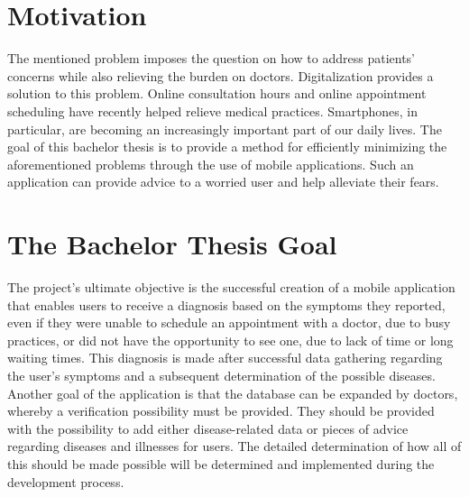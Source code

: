 \section{Motivation}
The mentioned problem imposes the question on how to address patients’ concerns while also relieving the burden on doctors. Digitalization provides a solution to this problem. Online consultation hours and online appointment scheduling have recently helped relieve medical practices. Smartphones, in particular, are becoming an increasingly important part of our daily lives. The goal of this bachelor thesis is to provide a method for efficiently minimizing the aforementioned problems through the use of mobile applications. Such an application can provide advice to a worried user and help alleviate their fears.

\section{The Bachelor Thesis Goal}
The project's ultimate objective is the successful creation of a mobile application that enables users to receive a diagnosis based on the symptoms they reported, even if they were unable to schedule an appointment with a doctor, due to busy practices, or did not have the opportunity to see one, due to lack of time or long waiting times. This diagnosis is made after successful data gathering regarding the user's symptoms and a subsequent determination of the possible diseases. Another goal of the application is that the database can be expanded by doctors, whereby a verification possibility must be provided. They should be provided with the possibility to add either disease-related data or pieces of advice regarding diseases and illnesses for users. The detailed determination of how all of this should be made possible will be determined and implemented during the development process.